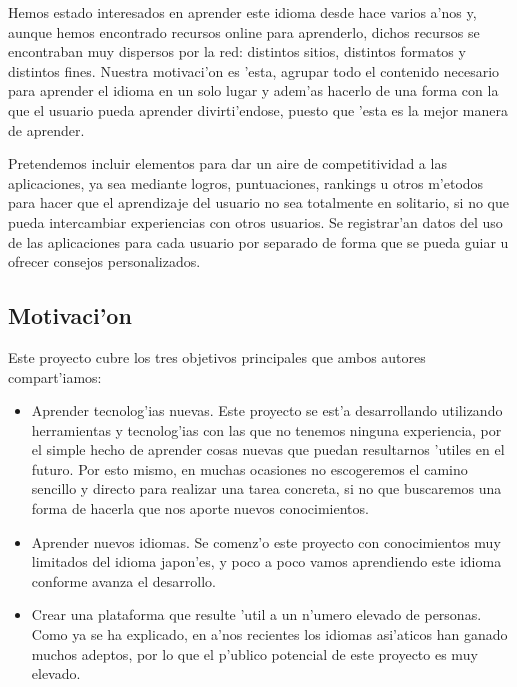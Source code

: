 Hemos estado interesados en aprender este idioma desde hace varios a'nos y,
aunque hemos encontrado recursos online para aprenderlo, dichos recursos se encontraban
muy dispersos por la red: distintos sitios, distintos formatos y distintos fines. Nuestra
motivaci'on es 'esta, agrupar todo el contenido necesario para aprender el idioma en un solo
lugar y adem'as hacerlo de una forma con la que el usuario pueda aprender divirti'endose, puesto que
'esta es la mejor manera de aprender.

Pretendemos incluir elementos para dar un aire de competitividad a las aplicaciones, ya sea
mediante logros, puntuaciones, rankings u otros m'etodos para hacer que el aprendizaje del
usuario no sea totalmente en solitario, si no que pueda intercambiar experiencias con otros
usuarios. Se registrar'an datos del uso de las aplicaciones para
cada usuario por separado de forma que se pueda guiar u ofrecer consejos personalizados.

\subsection{Motivaci'on}
\label{sub:motivacion}

Este proyecto cubre los tres objetivos principales que ambos autores compart'iamos:
\begin{itemize}
 \item Aprender tecnolog'ias nuevas. Este proyecto se est'a desarrollando utilizando
 herramientas y tecnolog'ias con las que no tenemos ninguna experiencia, por el simple
 hecho de aprender cosas nuevas que puedan resultarnos 'utiles en el futuro. Por esto mismo,
 en muchas ocasiones no escogeremos el camino sencillo y directo para realizar una tarea concreta,
 si no que buscaremos una forma de hacerla que nos aporte nuevos conocimientos.
 \item Aprender nuevos idiomas. Se comenz'o este proyecto con conocimientos muy limitados del
 idioma japon'es, y poco a poco vamos aprendiendo este idioma conforme avanza el desarrollo.
 \item Crear una plataforma que resulte 'util a un n'umero elevado de personas. Como ya se ha explicado,
 en a'nos recientes los idiomas asi'aticos han ganado muchos adeptos, por lo que el p'ublico potencial
 de este proyecto es muy elevado.
\end{itemize}


